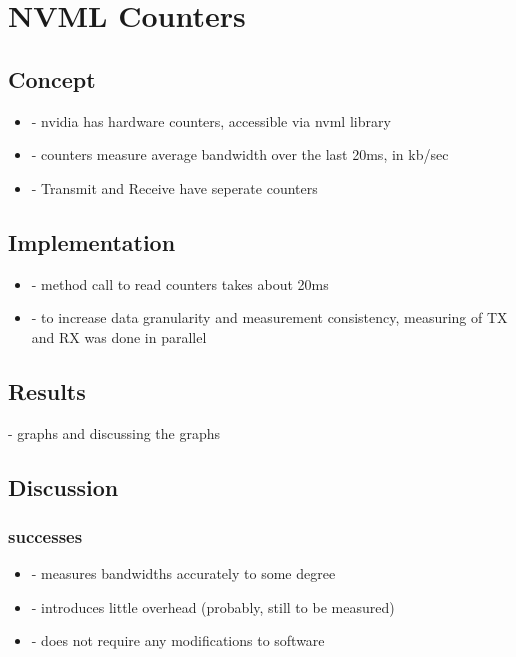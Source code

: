 
\chapter{NVML Counters}\label{chapter:nvml}

\section{Concept}

\begin{itemize}
	\item - nvidia has hardware counters, accessible via nvml library
	\item - counters measure average bandwidth over the last 20ms, in kb/sec
	\item - Transmit and Receive have seperate counters
\end{itemize}


\section{Implementation}
\begin{itemize}
	\item - method call to read counters takes about 20ms
	\item - to increase data granularity and measurement consistency, measuring of TX and RX was done in parallel
\end{itemize}



\section{Results}

- graphs and discussing the graphs

\section{Discussion}

\subsection{successes}
\begin{itemize}
	\item - measures bandwidths accurately to some degree
	\item - introduces little overhead (probably, still to be measured)
	\item - does not require any modifications to software
\end{itemize}

